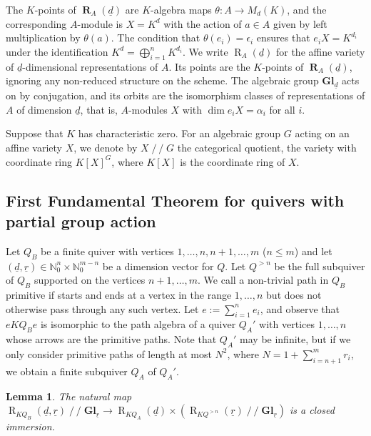 \documentclass[11pt,a4paper]{amsart}
\theoremstyle{plain}
\newtheorem{lem}[thm]{Lemma}
\theoremstyle{definition}
\begin{document}
The $K$-points of ${\operatorname{\mathbf{R}}_A(\underline{d})}$ are $K$-algebra maps $\theta:A\to M_d(K)$, and 
the corresponding $A$-module is $X = K^d$ with the action of $a\in A$ given by left
multiplication by $\theta(a)$. The condition that $\theta(e_i)=\epsilon_i$ ensures
that $e_i X = K^{d_i}$ under the identification $K^d = \bigoplus_{i=1}^n K^{d_i}$.
We write ${\operatorname{R}_A(\underline{d})}$ for the affine variety of ${\underline{d}}$-dimensional representations of $A$. Its points
are the $K$-points of ${\operatorname{\mathbf{R}}_A(\underline{d})}$, ignoring any non-reduced structure on the scheme.
The algebraic group ${\mathbf{Gl}_{\underline{d }}}$ acts on by conjugation, and its orbits are the isomorphism
classes of representations of $A$ of dimension ${\underline{d}}$, that is, $A$-modules $X$ with $\dim e_i X = \alpha_i$ for all $i$. 

Suppose that $K$ has characteristic zero. For an algebraic group $G$ 
acting on an affine variety $X$, we denote by $X\operatorname{/\!\!/} G$ the
categorical quotient, the variety with coordinate ring $K[X]^G$, where $K[X]$ is the
coordinate ring of $X$.

\subsection*{First Fundamental Theorem for quivers with partial group action}
\label{deframedquiver}
Let $Q_B$ be a finite quiver with vertices $1,\ldots , n, n+1, \ldots , m$ ($n \le m$)
and let $({\underline{d}}, {\underline{r}}) \in {\mathbb{N}}_0^n  \times {\mathbb{N}}_0^{m-n} $ be a dimension vector for $Q$. 
Let $Q^{>n}$ be the full subquiver of $Q_B$ supported on the vertices $n+1, \ldots , m$. 
We call a non-trivial path in $Q_B$ primitive if starts and ends at a vertex in the range $1, \ldots , n$ but does not otherwise pass through any such vertex. 
Let $e:= \sum_{i=1}^n e_i$, and observe that $e KQ_B e$ is isomorphic to the path algebra of a quiver $Q_A'$ with vertices $1, \ldots , n$ whose arrows are the primitive paths. Note that $Q_A'$
may be infinite, but if we only consider primitive paths of length at most $N^2$, where 
$N= 1+\sum_{i=n+1}^m r_i$, we obtain a finite subquiver $Q_A$ of $Q_A'$.

\begin{lem}
\label{l:quivedeframe}
The natural map
$
{\operatorname{R}_{KQ_B}(\underline{d},\underline{r})} \operatorname{/\!\!/} {\mathbf{Gl}_{\underline{r}}} \to {\operatorname{R}_{KQ_A}(\underline{d})} \times \left({\operatorname{R}_{KQ^{>n}}(\underline{r})} \operatorname{/\!\!/} {\mathbf{Gl}_{\underline{r}}} \right)
$
 is a closed immersion. 
\end{lem}
\end{document}
